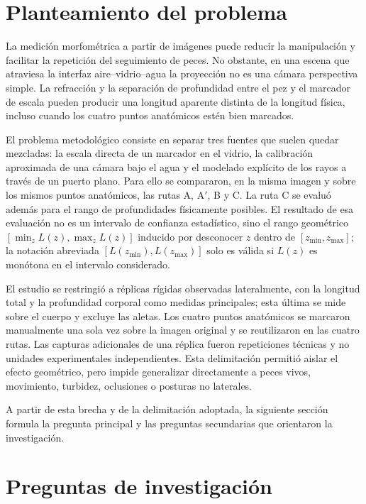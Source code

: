 \documentclass{report}
\newcommand{\Aprime}{A$'$}
\begin{document}
\section{Planteamiento del problema}

La medición morfométrica a partir de imágenes puede reducir la manipulación y facilitar la repetición del seguimiento de peces. No obstante, en una escena que atraviesa la interfaz aire--vidrio--agua la proyección no es una cámara perspectiva simple. La refracción y la separación de profundidad entre el pez y el marcador de escala pueden producir una longitud aparente distinta de la longitud física, incluso cuando los cuatro puntos anatómicos estén bien marcados.

El problema metodológico consiste en separar tres fuentes que suelen quedar mezcladas: la escala directa de un marcador en el vidrio, la calibración aproximada de una cámara bajo el agua y el modelado explícito de los rayos a través de un puerto plano. Para ello se compararon, en la misma imagen y sobre los mismos puntos anatómicos, las rutas A, \Aprime, B y C. La ruta C se evaluó además para el rango de profundidades físicamente posibles. El resultado de esa evaluación no es un intervalo de confianza estadístico, sino el rango geométrico $[\min_{z} L(z), \max_{z} L(z)]$ inducido por desconocer $z$ dentro de $[z_{\min}, z_{\max}]$; la notación abreviada $[L(z_{\min}), L(z_{\max})]$ solo es válida si $L(z)$ es monótona en el intervalo considerado.

El estudio se restringió a réplicas rígidas observadas lateralmente, con la longitud total y la profundidad corporal como medidas principales; esta última se mide sobre el cuerpo y excluye las aletas. Los cuatro puntos anatómicos se marcaron manualmente una sola vez sobre la imagen original y se reutilizaron en las cuatro rutas. Las capturas adicionales de una réplica fueron repeticiones técnicas y no unidades experimentales independientes. Esta delimitación permitió aislar el efecto geométrico, pero impide generalizar directamente a peces vivos, movimiento, turbidez, oclusiones o posturas no laterales.

A partir de esta brecha y de la delimitación adoptada, la siguiente sección formula la pregunta principal y las preguntas secundarias que orientaron la investigación.

\section{Preguntas de investigación}
\end{document}
